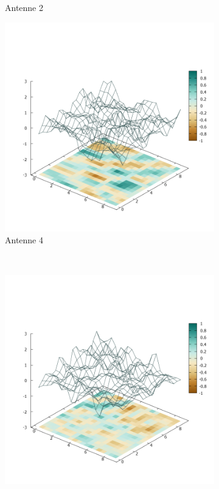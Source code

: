 \begin{figure}[h!]
\begin{subfigure}[b]{0.4\textwidth}
          	\caption[Loren ipsum]{Antenne 2}
         	\label{fig:Plate0_A2}
        \end{subfigure}
\qquad\qquad
        \begin{subfigure}[b]{0.4\textwidth}
			\centering
			\includegraphics[width=\textwidth]{img/Plate0_A4.png}
			\caption[Loren ipsum]{Antenne 4}
			\label{fig:Plate0_A3}
        \end{subfigure}
\\
        \begin{subfigure}[b]{0.4\textwidth}
			\centering
			\includegraphics[width=\textwidth]{img/Plate0_A3.png}

\end{subfigure}
\end{figure}
